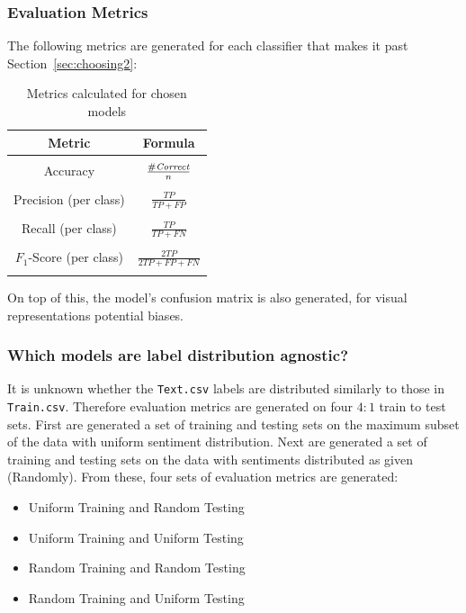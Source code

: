 \documentclass[11pt]{article}
\begin{document}
\subsubsection{Evaluation Metrics}\label{sec:evalmetrics}

The following metrics are generated for each classifier that makes it past Section~\ref{sec:choosing2}:
\begin{table}[!h]
	\begin{center}
		\begin{tabular}{|c|c|}			
			\hline
			Metric & Formula \\
			\hline\hline & \\
			Accuracy & $\frac{\#\emph{Correct}}{n}$ \\ & \\
			Precision (per class) & $\frac{TP}{TP + FP}$ \\ & \\
			Recall (per class) & $\frac{TP}{TP + FN}$ \\ & \\
			$F_1$-Score (per class) & $\frac{2TP}{2TP + FP + FN}$ \\ & \\
			\hline
		\end{tabular}
		\caption{Metrics calculated for chosen models}
		\label{tbl:cand-metrics}
	\end{center}
\end{table}

On top of this, the model's confusion matrix is also generated, for visual representations potential biases.

\subsubsection{Which models are label distribution agnostic?}

It is unknown whether the \texttt{Text.csv} labels are distributed similarly to those in \texttt{Train.csv}.
Therefore evaluation metrics are generated on four $4:1$ train to test sets.
First are generated a set of training and testing sets on the maximum subset of the data with uniform sentiment distribution.
Next are generated a set of training and testing sets on the data with sentiments distributed as given (Randomly).
From these, four sets of evaluation metrics are generated:
\begin{itemize}
	\item Uniform Training and Random Testing
	\item Uniform Training and Uniform Testing
	\item Random Training and Random Testing
	\item Random Training and Uniform Testing
\end{itemize}
\end{document}
